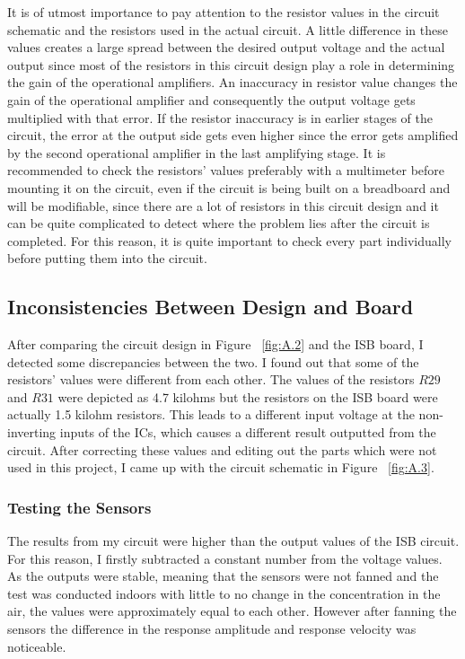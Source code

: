 It is of utmost importance to pay attention to the resistor values in the circuit schematic and the resistors used in the actual circuit. A little difference in these values creates a large spread between the desired output voltage and the actual output since most of the resistors in this circuit design play a role in determining the gain of the operational amplifiers. An inaccuracy in resistor value changes the gain of the operational amplifier and consequently the output voltage gets multiplied with that error. If the resistor inaccuracy is in earlier stages of the circuit, the error at the output side gets even higher since the error gets amplified by the second operational amplifier in the last amplifying stage. It is recommended to check the resistors' values preferably with a multimeter before mounting it on the circuit, even if the circuit is being built on a breadboard and will be modifiable, since there are a lot of resistors in this circuit design and it can be quite complicated to detect where the problem lies after the circuit is completed. For this reason, it is quite important to check every part individually before putting them into the circuit. \par 

\subsection{Inconsistencies Between Design and Board}
After comparing the circuit design in Figure  ~\ref{fig:A.2} and the ISB board, I detected some discrepancies between the two. I found out that some of the resistors' values were different from each other. The values of the resistors $R29$ and $R31$ were depicted as 4.7 kilohms but the resistors on the ISB board were actually 1.5 kilohm resistors. This leads to a different input voltage at the non-inverting inputs of the ICs, which causes a different result outputted from the circuit. After correcting these values and editing out the parts which were not used in this project, I came up with the circuit schematic in Figure  ~\ref{fig:A.3}. 



\subsubsection{Testing the Sensors}
The results from my circuit were higher than the output values of the ISB circuit. For this reason, I firstly subtracted a constant number from the voltage values. As the outputs were stable, meaning that the sensors were not fanned and the test was conducted indoors with little to no change in the  concentration in the air, the values were approximately equal to each other. However after fanning the sensors the difference in the response amplitude and response velocity was noticeable. 